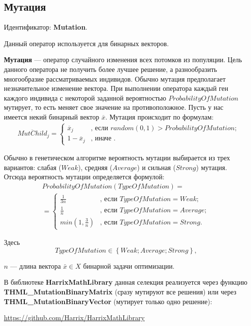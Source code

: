 \subsection{Мутация} \label{SetOfOperatorsAlgorithms:Mutation}

Идентификатор: \textbf{Mutation}.

Данный оператор используется для бинарных векторов.

\textbf{Мутация} --- оператор случайного изменения всех потомков из популяции. Цель данного оператора  не получить более лучшее решение, а разнообразить многообразие рассматриваемых индивидов. Обычно мутация предполагает незначительное изменение вектора. При выполнении оператора каждый ген каждого индивида с некоторой заданной вероятностью  $ ProbabilityOfMutation $ мутирует, то есть меняет свое значение на противоположное. Пусть у нас имеется некий бинарный вектор $ \overline{x} $.  Мутация происходит по формулам:
\begin{align}
\label{SetOfOperatorsAlgorithms:eq:Mutation}
&\overline{MutChild}_j=\left\lbrace \begin{aligned}
\overline{x}_j&\text{, если } random \left(0, 1 \right)>ProbabilityOfMutation; \\
1-\overline{x}_j&\text{, иначе }.
\end{aligned}\right.
\end{align}

Обычно в генетическом алгоритме вероятность мутации выбирается из трех вариантов: слабая ($ Weak $), средняя ($ Average $) и сильная ($ Strong $) мутация.
Отсюда вероятность мутации определяется формулой:
\begin{align}
\label{SetOfOperatorsAlgorithms:eq:ProbabilityOfMutation}
ProbabilityOfMutation\left( TypeOfMutation\right) =\\ =\left\lbrace \begin{aligned}
\frac{1}{3n}&\text{, если }TypeOfMutation=Weak; \\ \frac{1}{n}&\text{, если }TypeOfMutation=Average; \\ min\left(1, \frac{3}{n}\right) &\text{, если }TypeOfMutation=Strong.
\end{aligned}\right.\nonumber
\end{align}

Здесь
\begin{equation}
\label{SetOfOperatorsAlgorithms:eq:TypeOfMutation}
TypeOfMutation \in \left\lbrace Weak; Average;Strong\right\rbrace ,
\end{equation}

$ n $ --- длина вектора $ \bar{x}\in X $ бинарной задачи оптимизации.

В библиотеке \textbf{HarrixMathLibrary} данная селекция реализуется через функцию \textbf{THML\_MutationBinaryMatrix} (сразу мутируют все решения) или через \textbf{THML\_MutationBinaryVector} (мутирует только одно решение):

\href{https://github.com/Harrix/HarrixMathLibrary}{https://github.com/Harrix/HarrixMathLibrary}